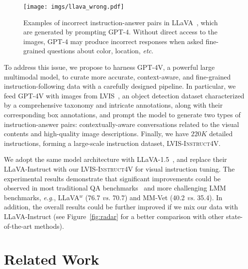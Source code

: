 \documentclass{article}
\makeatletter
\newcommand{\dataname}{\textsc{LVIS-Instruct4V}\xspace}
\newcommand*{\eg}{\emph{e.g.}\@\xspace}
\newcommand*{\etc}{\emph{etc}\@\xspace}
\newcommand*{\vs}{\emph{vs.}\@\xspace}
\makeatother
\begin{document}
\begin{figure}[t]
  \centering
  \texttt{[image: imgs/llava\_wrong.pdf]}
\caption{Examples of incorrect instruction-answer pairs in LLaVA~\cite{li2023llava}, which are generated by prompting GPT-4. Without direct access to the images, GPT-4 may produce incorrect responses when asked fine-grained questions about color, location, \etc. }
  \label{fig:llava_wrong}
\end{figure}


To address this issue, we propose to harness GPT-4V, a powerful large multimodal model, to curate more accurate, context-aware, and fine-grained instruction-following data with a carefully designed pipeline. In particular, we feed GPT-4V with images from LVIS~\cite{gupta2019lvis}, an object detection dataset characterized by a comprehensive taxonomy and intricate annotations, along with their corresponding box annotations, and prompt the model to generate two types of instruction-answer pairs: contextually-aware conversations related to the visual contents and high-quality image descriptions. Finally, we have $220K$ detailed instructions, forming a large-scale instruction dataset, \dataname. 

We adopt the same model architecture with LLaVA-1.5~\cite{liu2023improved}, and replace their LLaVA-Instruct with our \dataname for visual instruction tuning. The experimental results demonstrate that significant improvements could be observed in most traditional QA benchmarks~\cite{goyal2017vqav2,gurari2018vizwiz} and more challenging LMM benchmarks, \eg, LLaVA$^w$ (76.7 \vs 70.7) and MM-Vet (40.2 \vs 35.4). In addition, the overall results could be further improved if we mix our data with LLaVA-Instruct (see Figure~\ref{fig:radar} for a better comparison with other state-of-the-art methods).

 \section{Related Work}
\label{sec:related}
\end{document}
